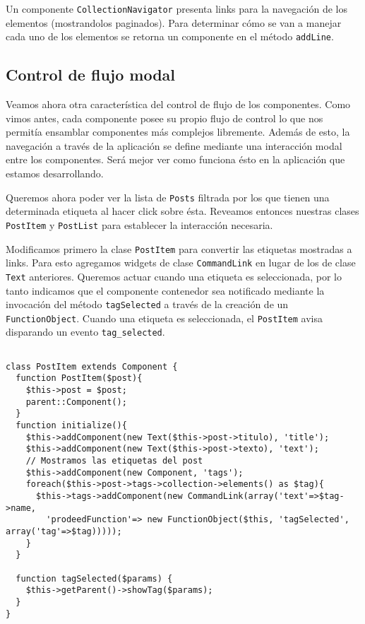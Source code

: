 Un componente \verb"CollectionNavigator" presenta links para la navegación de los elementos (mostrandolos paginados). Para determinar cómo se van a manejar cada uno de los elementos se retorna un componente en el método \verb"addLine".

\subsection{Control de flujo modal}
\label{sub-modal-flow}
Veamos ahora otra característica del control de flujo de los componentes. Como vimos antes, cada componente posee su propio flujo de control lo que nos permitía ensamblar componentes más complejos libremente. Además de esto, la navegación a través de la aplicación se define mediante una interacción modal entre los componentes. Será mejor ver como funciona ésto en la aplicación que estamos desarrollando.

Queremos ahora poder ver la lista de \verb"Posts" filtrada por los que tienen una determinada etiqueta al hacer click sobre ésta. Reveamos entonces nuestras clases \verb"PostItem" y \verb"PostList" para establecer la interacción necesaria.

Modificamos primero la clase \verb"PostItem" para convertir las etiquetas mostradas a links. Para esto agregamos widgets de clase \verb"CommandLink" en lugar de los de clase \verb"Text" anteriores. Queremos actuar cuando una etiqueta es seleccionada, por lo tanto indicamos que el componente contenedor sea notificado mediante la invocación del método \verb"tagSelected" a través de la creación de un \verb"FunctionObject". Cuando una etiqueta es seleccionada, el \verb"PostItem" avisa disparando  un evento \verb"tag_selected".

\begin{verbatim}

class PostItem extends Component {
  function PostItem($post){
    $this->post = $post;
    parent::Component();
  }
  function initialize(){
    $this->addComponent(new Text($this->post->titulo), 'title');
    $this->addComponent(new Text($this->post->texto), 'text');
    // Mostramos las etiquetas del post
    $this->addComponent(new Component, 'tags');
    foreach($this->post->tags->collection->elements() as $tag){
      $this->tags->addComponent(new CommandLink(array('text'=>$tag->name,
        'prodeedFunction'=> new FunctionObject($this, 'tagSelected', array('tag'=>$tag)))));
    }
  }

  function tagSelected($params) {
    $this->getParent()->showTag($params);
  }
}

\end{verbatim}

